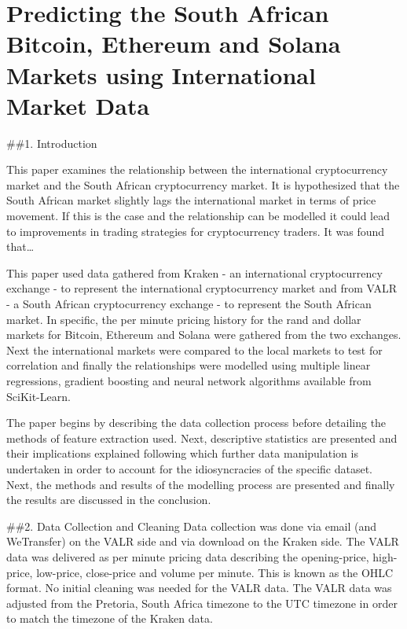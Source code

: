 \documentclass[
]{article}
\author{}
\date{\vspace{-2.5em}}
\begin{document}
\hypertarget{predicting-the-south-african-bitcoin-ethereum-and-solana-markets-using-international-market-data}{%
\section{Predicting the South African Bitcoin, Ethereum and Solana
Markets using International Market
Data}\label{predicting-the-south-african-bitcoin-ethereum-and-solana-markets-using-international-market-data}}

\#\#1. Introduction

This paper examines the relationship between the international
cryptocurrency market and the South African cryptocurrency market. It is
hypothesized that the South African market slightly lags the
international market in terms of price movement. If this is the case and
the relationship can be modelled it could lead to improvements in
trading strategies for cryptocurrency traders. It was found that\ldots{}

This paper used data gathered from Kraken - an international
cryptocurrency exchange - to represent the international cryptocurrency
market and from VALR - a South African cryptocurrency exchange - to
represent the South African market. In specific, the per minute pricing
history for the rand and dollar markets for Bitcoin, Ethereum and Solana
were gathered from the two exchanges. Next the international markets
were compared to the local markets to test for correlation and finally
the relationships were modelled using multiple linear regressions,
gradient boosting and neural network algorithms available from
SciKit-Learn.

The paper begins by describing the data collection process before
detailing the methods of feature extraction used. Next, descriptive
statistics are presented and their implications explained following
which further data manipulation is undertaken in order to account for
the idiosyncracies of the specific dataset. Next, the methods and
results of the modelling process are presented and finally the results
are discussed in the conclusion.

\#\#2. Data Collection and Cleaning Data collection was done via email
(and WeTransfer) on the VALR side and via download on the Kraken side.
The VALR data was delivered as per minute pricing data describing the
opening-price, high-price, low-price, close-price and volume per minute.
This is known as the OHLC format. No initial cleaning was needed for the
VALR data. The VALR data was adjusted from the Pretoria, South Africa
timezone to the UTC timezone in order to match the timezone of the
Kraken data.
\end{document}
